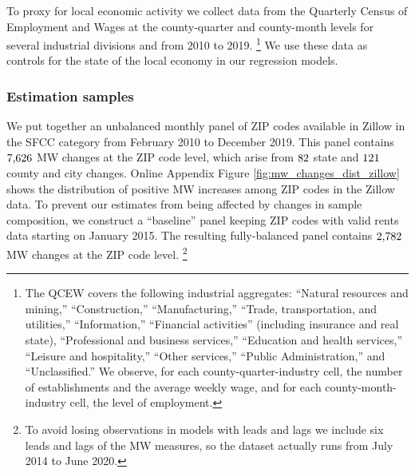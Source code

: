 To proxy for local economic activity we collect data from the 
Quarterly Census of Employment and Wages \parencite[QCEW;][]{QCEW} 
at the county-quarter and county-month levels for several industrial divisions 
and from 2010 to 2019.%
\footnote{The QCEW covers the following industrial aggregates: 
    ``Natural resources and mining,'' ``Construction,'' ``Manufacturing,'' 
    ``Trade, transportation, and utilities,'' ``Information,'' 
    ``Financial activities'' (including insurance and real state), 
    ``Professional and business services,'' ``Education and health services,'' 
    ``Leisure and hospitality,'' ``Other services,'' ``Public Administration,''
    and ``Unclassified.''
    We observe, for each county-quarter-industry cell, the number of 
    establishments and the average weekly wage, and for each 
    county-month-industry cell, the level of employment.}
We use these data as controls for the state of the local economy in our 
regression models.

\subsubsection{Estimation samples}\label{sec:data_final_panel}

We put together an unbalanced monthly panel of ZIP codes available in Zillow in 
the SFCC category from February 2010 to December 2019.
This panel contains $\textnormal{7,626}$ MW changes at the ZIP code level, 
which arise from $\textnormal{82}$ state and $\textnormal{121}$ 
county and city changes.
Online Appendix Figure \ref{fig:mw_changes_dist_zillow} shows the distribution 
of positive MW increases among ZIP codes in the Zillow data.
To prevent our estimates from being affected by changes in sample composition,
we construct a ``baseline'' panel keeping ZIP codes with valid rents data 
starting on January 2015.
The resulting fully-balanced panel contains $\textnormal{2,782}$ MW changes at 
the ZIP code level.%
\footnote{To avoid losing observations in models with leads and lags we include 
    six leads and lags of the MW measures, so the dataset actually runs from 
    July 2014 to June 2020.}

